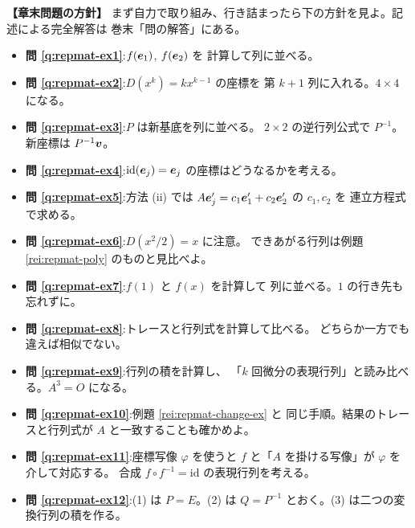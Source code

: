 \bigskip
{\small
\noindent\textbf{【章末問題の方針】}\quad
まず自力で取り組み、行き詰まったら下の方針を見よ。記述による完全解答は
巻末「問の解答」にある。
\begin{itemize}
\item \textbf{問 \ref{q:repmat-ex1}}:$f(\bm{e}_1)$, $f(\bm{e}_2)$ を
計算して列に並べる。
\item \textbf{問 \ref{q:repmat-ex2}}:$D(x^k) = kx^{k-1}$ の座標を
第 $k+1$ 列に入れる。$4 \times 4$ になる。
\item \textbf{問 \ref{q:repmat-ex3}}:$P$ は新基底を列に並べる。
$2 \times 2$ の逆行列公式で $P^{-1}$。新座標は $P^{-1}\bm{v}$。
\item \textbf{問 \ref{q:repmat-ex4}}:$\mathrm{id}(\bm{e}_j) = \bm{e}_j$
の座標はどうなるかを考える。
\item \textbf{問 \ref{q:repmat-ex5}}:方法 (ii) では
$A\bm{e}'_j = c_1\bm{e}'_1 + c_2\bm{e}'_2$ の $c_1, c_2$ を
連立方程式で求める。
\item \textbf{問 \ref{q:repmat-ex6}}:$D(x^2/2) = x$ に注意。
できあがる行列は例題 \ref{rei:repmat-poly} のものと見比べよ。
\item \textbf{問 \ref{q:repmat-ex7}}:$f(1)$ と $f(x)$ を計算して
列に並べる。$1$ の行き先も忘れずに。
\item \textbf{問 \ref{q:repmat-ex8}}:トレースと行列式を計算して比べる。
どちらか一方でも違えば相似でない。
\item \textbf{問 \ref{q:repmat-ex9}}:行列の積を計算し、
「$k$ 回微分の表現行列」と読み比べる。$A^3 = O$ になる。
\item \textbf{問 \ref{q:repmat-ex10}}:例題 \ref{rei:repmat-change-ex} と
同じ手順。結果のトレースと行列式が $A$ と一致することも確かめよ。
\item \textbf{問 \ref{q:repmat-ex11}}:座標写像 $\varphi$ を使うと
$f$ と「$A$ を掛ける写像」が $\varphi$ を介して対応する。
合成 $f \circ f^{-1} = \mathrm{id}$ の表現行列を考える。
\item \textbf{問 \ref{q:repmat-ex12}}:(1) は $P = E$。(2) は
$Q = P^{-1}$ とおく。(3) は二つの変換行列の積を作る。
\end{itemize}
}
